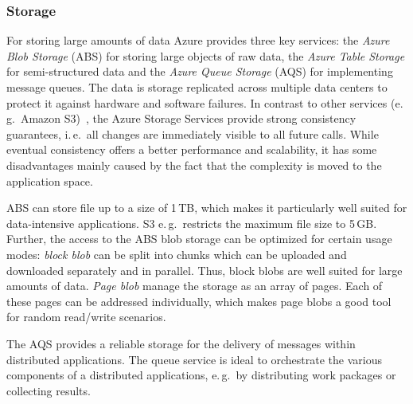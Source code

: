 \documentclass[conference,final]{IEEEtran}
\newcommand{\alnote}[1]{ {\textcolor{blue} { ***AL: #1 }}}
\newcommand{\jhanote}[1]{ {\textcolor{red} { ***SJ: #1 }}}
\newcommand{\alnote}[1]{}
\newcommand{\jhanote}[1]{}
\begin{document}
\subsubsection{Storage}

For storing large amounts of data Azure provides
three key services: the \emph{Azure Blob Storage} (ABS) for storing large
objects of raw data, the \emph{Azure Table Storage} for
semi-structured data and the \emph{Azure Queue Storage} (AQS) for
implementing message queues.  The data is storage replicated across
multiple data centers to protect it against hardware and software
failures. In contrast to other services (e.\,g.\ Amazon S3)~\cite{1294281}, the
Azure Storage Services provide strong consistency guarantees, i.\,e.\
all changes are immediately visible to all future calls. While
eventual consistency offers a better performance and scalability, 
it has some disadvantages mainly caused by the fact that the 
complexity is moved to the application space.

ABS can store file up to a size of 1\,TB, which makes it
particularly well suited for data-intensive applications. S3
e.\,g.\ restricts the maximum file size to 5\,GB. Further, the
access to the ABS blob storage can be optimized for certain usage modes:
\emph{block blob} can be split into chunks which can be uploaded and
downloaded separately and in parallel.  Thus, block blobs are well
suited for large amounts of data. \emph{Page
  blob} manage the storage as an array of pages. Each of these pages
can be addressed individually, which makes page blobs a good tool for
random read/write scenarios. 


The AQS provides a reliable storage for the delivery
of messages within distributed applications.  The queue service is
ideal to orchestrate the various components of a distributed
applications, e.\,g.\ by distributing work packages or collecting
results. 

\end{document}
